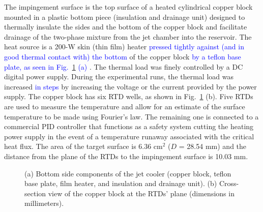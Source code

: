 \documentclass[review,preprint,12pt]{elsarticle}
\begin{document}
The impingement surface is the top surface of a heated cylindrical copper block mounted in a plastic bottom piece (insulation and drainage unit) designed to thermally insulate the sides and the bottom of the copper block and facilitate drainage of the two-phase mixture from the jet chamber into the reservoir. The heat source is a 200-W skin (thin film) heater \textcolor{blue}{pressed tightly against (and in good thermal contact with) the bottom} of the copper block \textcolor{blue}{by a teflon base plate, as seen in Fig.~\ref{fig:Figure_5} (a)} \cite{OliveiraBarbosaJr.2016}. The thermal load was finely controlled by a DC digital power supply. During the experimental runs, the thermal load was increased  \textcolor{blue}{in steps} by increasing the voltage or the current provided by the power supply. The copper block has six RTD wells, as shown in Fig.~\ref{fig:Figure_5} (b). Five RTDs are used to measure the temperature and allow for an estimate of the surface temperature to be made using Fourier's law. The remaining one is connected to a commercial PID controller that functions as a safety system cutting the heating power supply in the event of a temperature runaway associated with the critical heat flux. The area of the target surface is 6.36 cm$^{2}$ ($D$ = 28.54 mm) and the distance from the plane of the RTDs to the impingement surface is 10.03 mm.

\begin{figure}[!htp]
\centering
{}
\hfil
{}
\caption{(a) Bottom side components of the jet cooler (copper block, teflon base plate, film heater, and insulation and drainage unit). (b) Cross-section view of the copper block at the RTDs' plane (dimensions in millimeters).}
\label{fig:Figure_5}
\end{figure}
 
\end{document}
